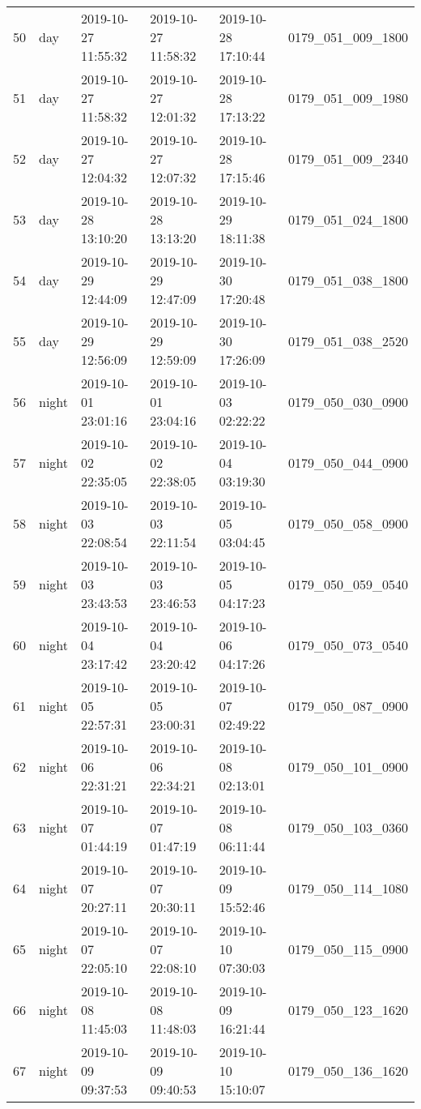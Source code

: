 \begin{longtable}{rlllll}
      50 &      day & 2019-10-27 11:55:32 & 2019-10-27 11:58:32 & 2019-10-28 17:10:44 & 0179\_051\_009\_1800 \\
      51 &      day & 2019-10-27 11:58:32 & 2019-10-27 12:01:32 & 2019-10-28 17:13:22 & 0179\_051\_009\_1980 \\
      52 &      day & 2019-10-27 12:04:32 & 2019-10-27 12:07:32 & 2019-10-28 17:15:46 & 0179\_051\_009\_2340 \\
      53 &      day & 2019-10-28 13:10:20 & 2019-10-28 13:13:20 & 2019-10-29 18:11:38 & 0179\_051\_024\_1800 \\
      54 &      day & 2019-10-29 12:44:09 & 2019-10-29 12:47:09 & 2019-10-30 17:20:48 & 0179\_051\_038\_1800 \\
      55 &      day & 2019-10-29 12:56:09 & 2019-10-29 12:59:09 & 2019-10-30 17:26:09 & 0179\_051\_038\_2520 \\
      56 &    night & 2019-10-01 23:01:16 & 2019-10-01 23:04:16 & 2019-10-03 02:22:22 & 0179\_050\_030\_0900 \\
      57 &    night & 2019-10-02 22:35:05 & 2019-10-02 22:38:05 & 2019-10-04 03:19:30 & 0179\_050\_044\_0900 \\
      58 &    night & 2019-10-03 22:08:54 & 2019-10-03 22:11:54 & 2019-10-05 03:04:45 & 0179\_050\_058\_0900 \\
      59 &    night & 2019-10-03 23:43:53 & 2019-10-03 23:46:53 & 2019-10-05 04:17:23 & 0179\_050\_059\_0540 \\
      60 &    night & 2019-10-04 23:17:42 & 2019-10-04 23:20:42 & 2019-10-06 04:17:26 & 0179\_050\_073\_0540 \\
      61 &    night & 2019-10-05 22:57:31 & 2019-10-05 23:00:31 & 2019-10-07 02:49:22 & 0179\_050\_087\_0900 \\
      62 &    night & 2019-10-06 22:31:21 & 2019-10-06 22:34:21 & 2019-10-08 02:13:01 & 0179\_050\_101\_0900 \\
      63 &    night & 2019-10-07 01:44:19 & 2019-10-07 01:47:19 & 2019-10-08 06:11:44 & 0179\_050\_103\_0360 \\
      64 &    night & 2019-10-07 20:27:11 & 2019-10-07 20:30:11 & 2019-10-09 15:52:46 & 0179\_050\_114\_1080 \\
      65 &    night & 2019-10-07 22:05:10 & 2019-10-07 22:08:10 & 2019-10-10 07:30:03 & 0179\_050\_115\_0900 \\
      66 &    night & 2019-10-08 11:45:03 & 2019-10-08 11:48:03 & 2019-10-09 16:21:44 & 0179\_050\_123\_1620 \\
      67 &    night & 2019-10-09 09:37:53 & 2019-10-09 09:40:53 & 2019-10-10 15:10:07 & 0179\_050\_136\_1620 \\

\end{longtable}
